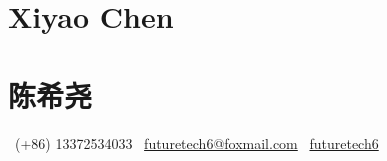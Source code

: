 \ifdefined\english

    \part*{Xiyao Chen}



\else

    \part*{陈希尧}



\fi

~(+86) 13372534033
\quad \textbar{} \quad
{}~\href{mailto:futuretech6@foxmail.com}{futuretech6@foxmail.com}
\quad \textbar{} \quad
{}~\href{https://github.com/futuretech6}{futuretech6}









